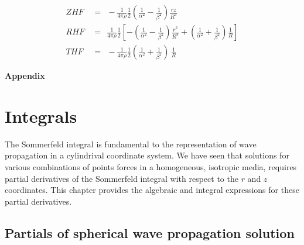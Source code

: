 \documentclass{article}
\begin{document}
\begin{equation*}
\begin{aligned}
ZHF \,&=  \ \   - \frac{1}{  4 \pi \rho } \frac{1}{ 2 }\left( \frac{1}{ \alpha^2 }- \frac{1}{ \beta^2 }\right) \frac{rz}{ R^3 } \\
RHF \,&=  \ \   \frac{1}{  4 \pi \rho } \frac{1}{ 2 }\left[ { 
 - \left( \frac{1}{ \alpha^2 }- \frac{1}{ \beta^2 }\right) \frac{ r^2  }{  R^3 } 
+ \left( \frac{1}{ \alpha^2 }+ \frac{1}{ \beta^2 }\right) \frac{1}{ R }} \right] \\
THF \,&=  \ \   - \frac{1}{  4 \pi \rho } \frac{1}{ 2 }\left(  \frac{1}{ \alpha^2 }+ \frac{1}{ \beta^2 }\right) \, \frac{1}{ R }
\end{aligned}
\end{equation*}





\appendix
\begin{center}
      {\bf Appendix}
    \end{center}
\chapter{Integrals}

The Sommerfeld integral is fundamental to the representation of wave propagation in a cylindrival coordinate system. We have seen  that solutions for various combinations of points forces in a homogeneous, isotropic media, requires partial derivatives of the Sommerfeld integral with respect to the $r$ and $ z $ coordinates. This chapter provides the algebraic and integral expressions for these partial derivatives. 


\section{Partials of spherical wave propagation solution}
\end{document}
